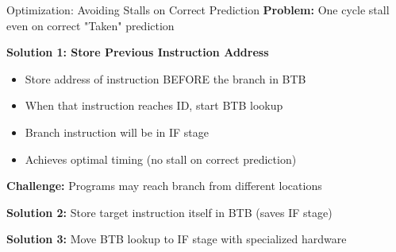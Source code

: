 \documentclass[aspectratio=169,12pt]{beamer}
\begin{document}
\begin{frame}{Optimization: Avoiding Stalls on Correct Prediction}
\textbf{Problem:} One cycle stall even on correct "Taken" prediction

\textbf{Solution 1: Store Previous Instruction Address}
\begin{itemize}
    \item Store address of instruction BEFORE the branch in BTB
    \item When that instruction reaches ID, start BTB lookup
    \item Branch instruction will be in IF stage
    \item Achieves optimal timing (no stall on correct prediction)
\end{itemize}

\textbf{Challenge:} Programs may reach branch from different locations
\begin{center}
\end{center}

\textbf{Solution 2:} Store target instruction itself in BTB (saves IF stage)

\textbf{Solution 3:} Move BTB lookup to IF stage with specialized hardware
\end{frame}
\end{document}

